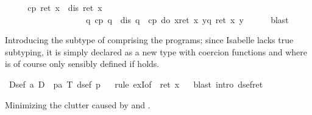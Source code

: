 \begin{isabellebody}
\ \ \isamarkupfalse%
\ \isamarkupfalse%
\ {\isachardoublequote}cp\ {\isacharparenleft}ret\ x{\isacharparenright}\ {\isasymand}\ dis\ {\isacharparenleft}ret\ x{\isacharparenright}\ {\isasymand}\ \isanewline
\ \ \ \ \ \ \ \ \ \ \ \ \ \ \ \ \ \ \ {\isacharparenleft}{\isasymforall}q{\isachardot}\ cp\ q\ {\isasymand}\ dis\ q\ {\isasymlongrightarrow}\ cp\ {\isacharparenleft}do\ {\isacharbraceleft}x{\isasymleftarrow}ret\ x{\isacharsemicolon}\ y{\isasymleftarrow}q{\isacharsemicolon}\ ret\ {\isacharparenleft}x{\isacharcomma}\ y{\isacharparenright}{\isacharbraceright}{\isacharparenright}{\isacharparenright}{\isachardoublequote}\isanewline
\ \ \ \ \isamarkupfalse%
\ blast\isanewline
\isamarkupfalse%
\isamarkupfalse%
%
\isamarkuptrue%
%
\begin{isamarkuptext}%
Introducing the subtype  of  comprising the 
 programs;
  since Isabelle lacks true subtyping, it is simply declared as a new type
  with coercion functions 
  and 
  where  is of course only sensibly defined if 
   holds.
  \label{isa:intro-dsef}%
\end{isamarkuptext}%
\isamarkuptrue%
\ {\isacharparenleft}Dsef{\isacharparenright}\ {\isacharparenleft}{\isacharprime}a{\isacharparenright}\ D\ {\isacharequal}\ {\isachardoublequote}{\isacharbraceleft}p{\isacharcolon}{\isacharcolon}{\isacharprime}a\ T{\isachardot}\ dsef\ p{\isacharbraceright}{\isachardoublequote}\isanewline
\ \ \isamarkupfalse%
rule\ exI{\isacharbrackleft}of\ {\isacharunderscore}\ {\isachardoublequote}ret\ x{\isachardoublequote}{\isacharbrackright}{\isacharparenright}\isanewline
\ \ \isamarkupfalse%
blast\ intro{\isacharcolon}\ dsef{\isacharunderscore}ret{\isacharparenright}\isanewline
\isamarkupfalse%
\isamarkupfalse%
%
\begin{isamarkuptext}%
Minimizing the clutter caused by  and .%
\end{isamarkuptext}%
\isamarkuptrue%

\end{isabellebody}
